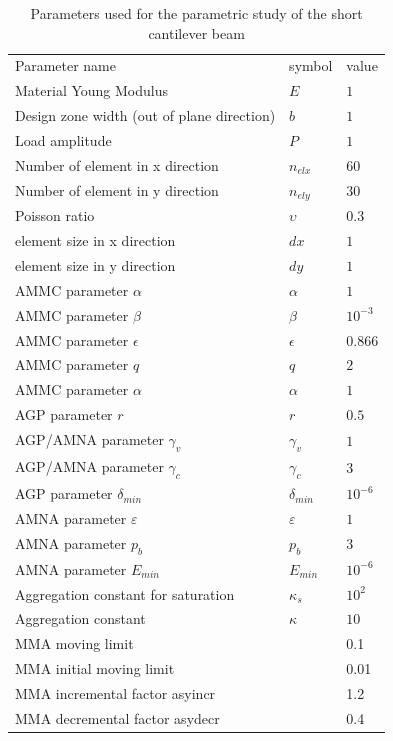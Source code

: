 \begin{table}[h!]
\caption{Parameters used for the parametric study of the short cantilever beam}
\label{tab:3}       %
\centering
\begin{tabular}{lll}
\hline\noalign{\smallskip}
Parameter name & symbol & value \\
\noalign{\smallskip}\hline\noalign{\smallskip}
Material Young Modulus & $E$ & $1$\\
Design zone width (out of plane direction) & $b$ & $1$\\
Load amplitude & $P$ & $1$\\
Number of element in x direction & $n_{elx}$ & $60$\\
Number of element in y direction & $n_{ely}$ & $30$\\
Poisson ratio & $\upsilon$ & $0.3$\\
element size in x direction & $dx$ & $1$\\
element size in y direction & $dy$ & $1$\\
AMMC parameter $\alpha$ & $\alpha$ & $1$\\
AMMC parameter $\beta$ & $\beta$ & $10^{-3}$\\
AMMC parameter $\epsilon$ & $\epsilon$ & $0.866$\\
AMMC parameter $q$ & $q$ & $2$\\
AMMC parameter $\alpha$ & $\alpha$ & $1$\\
AGP parameter $r$ & $r$ & $0.5$\\
AGP/AMNA parameter $\gamma_v$ & $\gamma_v$ & $1$\\
AGP/AMNA parameter $\gamma_c$ & $\gamma_c$ & $3$\\
AGP parameter $\delta_{min}$ & $\delta_{min}$ & $10^{-6}$\\
AMNA parameter $\varepsilon$ & $\varepsilon$ & $1$\\
AMNA parameter $p_b$ & $p_b$ & $3$\\
AMNA parameter $E_{min}$ & $E_{min}$ & $10^{-6}$\\
Aggregation constant for saturation & $\kappa_s$ & $10^{2}$\\
Aggregation constant  & $\kappa$ & $10$\\
MMA moving limit & & 0.1\\
MMA initial moving limit & & 0.01\\
MMA incremental factor asyincr  & & 1.2\\
MMA decremental factor asydecr & & 0.4\\

\end{tabular}
\end{table}
